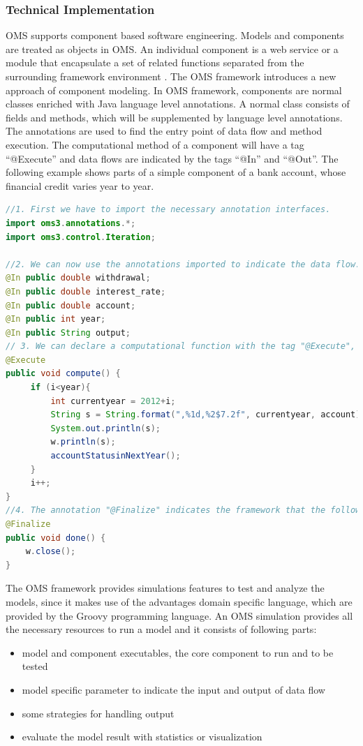 \subsubsection{Technical Implementation}
\par
OMS supports component based software engineering. Models and components are treated as objects in OMS. An individual component is a web service or a module that encapsulate a set of related functions separated from the surrounding framework environment \autocite{dsl:oms-component_based}. The OMS framework introduces a new approach of component modeling. In OMS framework, components are normal classes enriched with Java language level annotations. A normal class consists of fields and methods, which will be supplemented by language level annotations. The annotations are used to find the entry point of data flow and method execution. The computational method of a component will have a tag “@Execute” and data flows are indicated by the tags “@In” and “@Out”.
The following example shows parts of a simple component of a bank account, whose financial credit varies year to year.
\begin{lstlisting}[language=Java]
//1. First we have to import the necessary annotation interfaces.
import oms3.annotations.*;
import oms3.control.Iteration;

//2. We can now use the annotations imported to indicate the data flow.
@In public double withdrawal;
@In public double interest_rate;
@In public double account;
@In public int year;
@In public String output;
// 3. We can declare a computational function with the tag "@Execute", which processes the data flow.
@Execute
public void compute() {
	 if (i<year){
		 int currentyear = 2012+i;
		 String s = String.format(",%1d,%2$7.2f", currentyear, account);
		 System.out.println(s);
		 w.println(s);
		 accountStatusinNextYear();
	 }
	 i++;
}
//4. The annotation "@Finalize" indicates the framework that the following method will be executed at last to finalize the processing of data flow.
@Finalize
public void done() {
	w.close();
}
\end{lstlisting}
\par
The OMS framework provides simulations features to test and analyze the models, since it makes use of the advantages domain specific language, which are provided by the Groovy programming language. An OMS simulation provides all the necessary resources to run a model and it consists of following parts:
\begin{itemize}
  \item model and component executables, the core component to run and to be tested	
  \item model specific parameter to indicate the input and output of data flow
  \item some strategies for handling output	
  \item evaluate the model result with statistics or visualization
\end{itemize}
